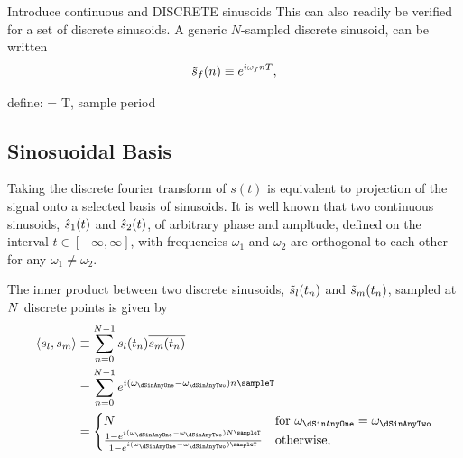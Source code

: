 Introduce continuous and DISCRETE sinusoids
This can also readily be verified for a set of discrete sinusoids. A generic $N$-sampled discrete sinusoid, can be written
$$
\tilde{s}_f(n) \equiv e^{i\omega_f n T},
$$

define:
\Nsamples
\sampleT = T, sample period

\subsection{Sinosuoidal Basis}
Taking the discrete fourier transform of $s(t)$ is equivalent to
projection of the signal onto a selected basis of sinusoids. It is well known
that two continuous sinusoids, $\hat{s}_1(t)$ and $\hat{s}_2(t)$, of arbitrary phase and ampltude, defined on the interval $t \in [-\infty, \infty]$, with frequencies $\omega_1$ and $\omega_2$ are orthogonal to each other for any $\omega_1 \neq \omega_2$.

The inner product between two discrete sinusoids, $\tilde{s}_{l}(t_n)$ and $\tilde{s}_{m}(t_n)$, sampled at $N$ discrete points is given by 
\begin{align}
  \left< \dSinOne, \dSinTwo \right>
  &\equiv \DFTsum \dSinOne(\dtime) \complexConj{\dSinTwo(\dtime)} \\
  &= \DFTsum e^{i ( \omegaSinOne - \omegaSinTwo) \nDFT \sampleT } \\
  &= \begin{cases}
    \Nsamples & \textrm{for}\ \omegaSinOne = \omegaSinTwo \\
    \frac{ 1 - e^{i ( \omegaSinOne - \omegaSinTwo) \Nsamples \sampleT} }{ 1 - e^{i ( \omegaSinOne - \omegaSinTwo) \sampleT} } & \textrm{otherwise}
,
    \end{cases}
\label{eq:inner-product-general}
\end{align}

